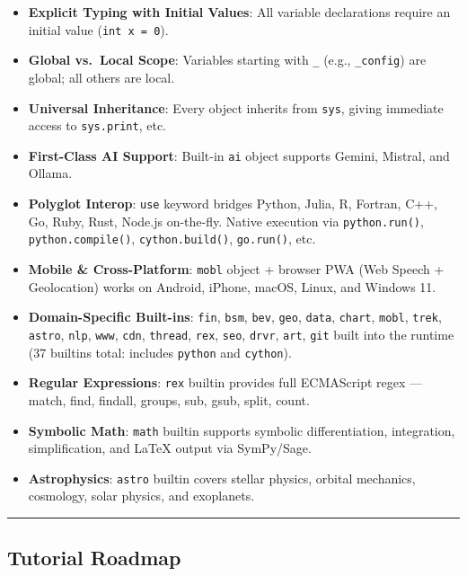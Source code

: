 \documentclass[
]{article}
\providecommand{\tightlist}{%
  \setlength{\itemsep}{0pt}\setlength{\parskip}{0pt}}
\begin{document}
\begin{itemize}
\tightlist
\item
  \textbf{Explicit Typing with Initial Values}: All variable
  declarations require an initial value (\texttt{int\ x\ =\ 0}).
\item
  \textbf{Global vs.~Local Scope}: Variables starting with \texttt{\_}
  (e.g., \texttt{\_config}) are global; all others are local.
\item
  \textbf{Universal Inheritance}: Every object inherits from
  \texttt{sys}, giving immediate access to \texttt{sys.print}, etc.
\item
  \textbf{First-Class AI Support}: Built-in \texttt{ai} object supports
  Gemini, Mistral, and Ollama.
\item
  \textbf{Polyglot Interop}: \texttt{use} keyword bridges Python, Julia,
  R, Fortran, C++, Go, Ruby, Rust, Node.js on-the-fly. Native execution
  via \texttt{python.run()}, \texttt{python.compile()},
  \texttt{cython.build()}, \texttt{go.run()}, etc.
\item
  \textbf{Mobile \& Cross-Platform}: \texttt{mobl} object + browser PWA
  (Web Speech + Geolocation) works on Android, iPhone, macOS, Linux, and
  Windows 11.
\item
  \textbf{Domain-Specific Built-ins}: \texttt{fin}, \texttt{bsm},
  \texttt{bev}, \texttt{geo}, \texttt{data}, \texttt{chart},
  \texttt{mobl}, \texttt{trek}, \texttt{astro}, \texttt{nlp},
  \texttt{www}, \texttt{cdn}, \texttt{thread}, \texttt{rex},
  \texttt{seo}, \texttt{drvr}, \texttt{art}, \texttt{git} built into the
  runtime (37 builtins total: includes \texttt{python} and
  \texttt{cython}).
\item
  \textbf{Regular Expressions}: \texttt{rex} builtin provides full
  ECMAScript regex --- match, find, findall, groups, sub, gsub, split,
  count.
\item
  \textbf{Symbolic Math}: \texttt{math} builtin supports symbolic
  differentiation, integration, simplification, and LaTeX output via
  SymPy/Sage.
\item
  \textbf{Astrophysics}: \texttt{astro} builtin covers stellar physics,
  orbital mechanics, cosmology, solar physics, and exoplanets.
\end{itemize}

\begin{center}\rule{0.5\linewidth}{0.5pt}\end{center}

\subsection{Tutorial Roadmap}\label{tutorial-roadmap}
\end{document}
